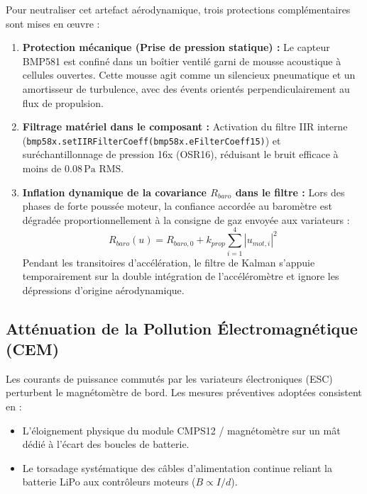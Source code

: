\documentclass[../Implementation.tex]{subfiles}
\begin{document}
Pour neutraliser cet artefact aérodynamique, trois protections complémentaires sont mises en œuvre :
\begin{enumerate}
    \item \textbf{Protection mécanique (Prise de pression statique) :}
    Le capteur BMP581 est confiné dans un boîtier ventilé garni de mousse acoustique à cellules ouvertes. Cette mousse agit comme un silencieux pneumatique et un amortisseur de turbulence, avec des évents orientés perpendiculairement au flux de propulsion.
    \item \textbf{Filtrage matériel dans le composant :}
    Activation du filtre IIR interne (\lstinline|bmp58x.setIIRFilterCoeff(bmp58x.eFilterCoeff15)|) et suréchantillonnage de pression 16x (OSR16), réduisant le bruit efficace à moins de $0.08\,\text{Pa RMS}$.
    \item \textbf{Inflation dynamique de la covariance $R_{baro}$ dans le filtre :}
    Lors des phases de forte poussée moteur, la confiance accordée au baromètre est dégradée proportionnellement à la consigne de gaz envoyée aux variateurs :
    \begin{equation}
        R_{baro}(u) = R_{baro, 0} + k_{prop} \sum_{i=1}^4 |u_{mot, i}|^2
    \end{equation}
    Pendant les transitoires d'accélération, le filtre de Kalman s'appuie temporairement sur la double intégration de l'accéléromètre et ignore les dépressions d'origine aérodynamique.
\end{enumerate}

\subsection{Atténuation de la Pollution Électromagnétique (CEM)}

Les courants de puissance commutés par les variateurs électroniques (ESC) perturbent le magnétomètre de bord. Les mesures préventives adoptées consistent en :
\begin{itemize}
    \item L'éloignement physique du module CMPS12 / magnétomètre sur un mât dédié à l'écart des boucles de batterie.
    \item Le torsadage systématique des câbles d'alimentation continue reliant la batterie LiPo aux contrôleurs moteurs ($B \propto I / d$).
\end{itemize}
\end{document}
